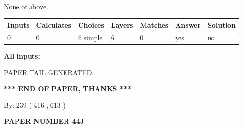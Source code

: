 \documentclass{ctexart}
\begin{document}
 
 None of above.
 
 
\noindent{}
 
 
   
   
   
   
\noindent\begin{tabular}{|l|l|l|l|l|l|l|}
 \hline
Inputs & Calculates & Choices & Layers & Matches & Answer & Solution \\ \hline
 0  & 
 0  & 
 6
  simple  
  & 
 6  & 
 0  & 
  yes & 
  no 
  \\ \hline
 \end{tabular}
   
   
   
   
\noindent{}
   
   
   
   
\noindent\vspace{0.1in}\hspace{-0.08in} {\textbf{\Large{All inputs: }}}
   
   
   
   
   
   
 \vspace{0.2in}
 
   
   
\vspace{2.0in} PAPER TAIL GENERATED.
   
   
   
   
\vspace{1.0in} 
{\textbf{\large{ *** END OF PAPER, THANKS *** }}} 
   
   
\hspace{1.0in} By: 
 239 ( 416 ,  613 )
   
   
   
   
\newpage 
\setcounter{page}{ 
   443001 } 
   
   
   
   
 {\textbf{ \Large{ PAPER NUMBER  443  }}}
   
   
\vspace{0.2in}
   
   
   
   
   
   
   
\end{document}
